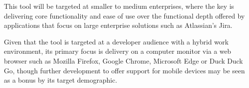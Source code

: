 \documentclass[l4proj.tex]{subfiles}
\begin{document}
This tool will be targeted at smaller to medium enterprises, where the key is delivering core functionality and ease of use over the functional depth offered by applications that focus on large enterprise solutions such as Atlassian’s Jira.

Given that the tool is targeted at a developer audience with a hybrid work environment, its primary focus is delivery on a computer monitor via a web browser such as Mozilla Firefox, Google Chrome, Microsoft Edge or Duck Duck Go, though further development to offer support for mobile devices may be seen as a bonus by its target demographic.
\end{document}
